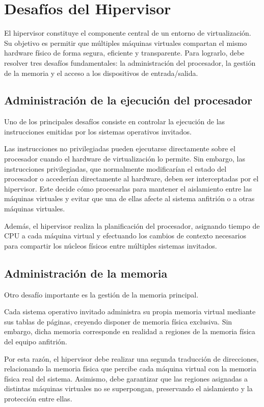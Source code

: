 \section{Desafíos del Hipervisor}

El hipervisor constituye el componente central de un entorno de virtualización. Su objetivo es permitir que múltiples máquinas virtuales compartan el mismo hardware físico de forma segura, eficiente y transparente. Para lograrlo, debe resolver tres desafíos fundamentales: la administración del procesador, la gestión de la memoria y el acceso a los dispositivos de entrada/salida.

\subsection{Administración de la ejecución del procesador}

Uno de los principales desafíos consiste en controlar la ejecución de las instrucciones emitidas por los sistemas operativos invitados.

Las instrucciones no privilegiadas pueden ejecutarse directamente sobre el procesador cuando el hardware de virtualización lo permite. Sin embargo, las instrucciones privilegiadas, que normalmente modificarían el estado del procesador o accederían directamente al hardware, deben ser interceptadas por el hipervisor. Este decide cómo procesarlas para mantener el aislamiento entre las máquinas virtuales y evitar que una de ellas afecte al sistema anfitrión o a otras máquinas virtuales.

Además, el hipervisor realiza la planificación del procesador, asignando tiempo de CPU a cada máquina virtual y efectuando los cambios de contexto necesarios para compartir los núcleos físicos entre múltiples sistemas invitados.

\subsection{Administración de la memoria}

Otro desafío importante es la gestión de la memoria principal.

Cada sistema operativo invitado administra su propia memoria virtual mediante sus tablas de páginas, creyendo disponer de memoria física exclusiva. Sin embargo, dicha memoria corresponde en realidad a regiones de la memoria física del equipo anfitrión.

Por esta razón, el hipervisor debe realizar una segunda traducción de direcciones, relacionando la memoria física que percibe cada máquina virtual con la memoria física real del sistema. Asimismo, debe garantizar que las regiones asignadas a distintas máquinas virtuales no se superpongan, preservando el aislamiento y la protección entre ellas.

